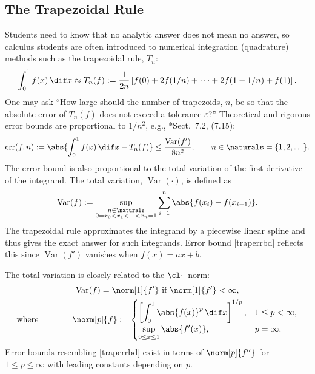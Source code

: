 \documentclass[]{amsart}
\DeclareMathOperator{\Var}{Var}
\DeclareMathOperator{\err}{err}
\theoremstyle{definition}
\theoremstyle{remark}
\begin{document}
\subsection{The Trapezoidal Rule}
Students need to know that no analytic answer does not mean no answer, so calculus students are often introduced to numerical integration (quadrature) methods such as the trapezoidal rule, $T_n$:
\begin{equation}
\int_0^1 f(x) \, \dif x \approx T_n(f) := \frac{1}{2n} \left [ f(0) + 2 f(1/n) + \cdots + 2 f(1-1/n) + f(1) \right].
\end{equation}
One may ask ``How large should the number of trapezoids, $n$, be so that the absolute error of $T_n(f)$ does not exceed a tolerance $\varepsilon$?''  Theoretical and rigorous error bounds are proportional to $1/n^2$, e.g., *{Sect.\ 7.2, (7.15)}: 
\begin{equation} \label{traperrbd}
\err(f,n) := \abs{\int_0^1 f(x) \, \dif x - T_n(f)} \le \frac{\Var(f')}{8n^2}, \qquad n \in \naturals = \{1, 2, \ldots \}. 
\end{equation}
The error bound is also proportional to the total variation of the first derivative of the integrand.  The total variation, $\Var(\cdot)$, is defined as
\begin{equation} \label{vardef}
\Var(f) := \sup_{\substack{n \in \naturals\\ 0 = x_0 < x_1 < \cdots < x_{n} =1}} \sum_{i=1}^n \abs{f(x_i)-f(x_{i-1})}.
\end{equation}
The trapezoidal rule approximates the integrand by a piecewise linear spline and thus gives the exact answer for such integrands.  Error bound \eqref{traperrbd} reflects this since  $\Var(f')$ vanishes when $f(x)=ax+b$.

The total variation is closely related to the $\cl_1$-norm:
\begin{gather*}
\Var(f)= \norm[1]{f'} \text{ if } \norm[1]{f'}< \infty, \\ 
\text{where} \qquad \qquad \norm[p]{f}:= \begin{cases} \displaystyle \left[\int_0^1 \abs{f(x)}^p \, \dif x \right]^{1/p}, & 1 \le p < \infty,\\[1ex]
\displaystyle  \sup_{0 \le x \le 1} \abs{f'(x)}, & p=\infty.
\end{cases}
\end{gather*}
Error bounds resembling \eqref{traperrbd} exist in terms of $\norm[p]{f''}$ for $1 \le p \le \infty$ with leading constants depending on $p$.  
\end{document}
